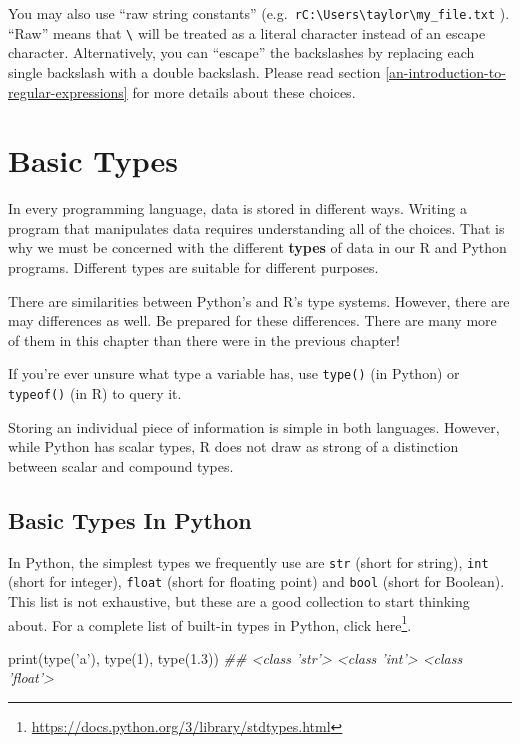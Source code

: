 \documentclass[12pt,krantz2]{krantz}
\makeatletter
\newenvironment{Shaded}{\begin{snugshade}}{\end{snugshade}}
\newcommand{\BuiltInTok}[1]{#1}
\newcommand{\CommentTok}[1]{\textcolor[rgb]{0.37,0.37,0.37}{\textit{#1}}}
\newcommand{\DecValTok}[1]{\textcolor[rgb]{0.06,0.06,0.06}{#1}}
\newcommand{\FloatTok}[1]{\textcolor[rgb]{0.06,0.06,0.06}{#1}}
\newcommand{\NormalTok}[1]{#1}
\newcommand{\StringTok}[1]{\textcolor[rgb]{0.5,0.5,0.5}{#1}}
\renewcommand{\href}[2]{#2\footnote{\url{#1}}}
\newenvironment{kframe}{%
\medskip{}
\setlength{\fboxsep}{.8em}
 \def\at@end@of@kframe{}%
 \ifinner\ifhmode%
  \def\at@end@of@kframe{\end{minipage}}%
  \begin{minipage}{\columnwidth}%
 \fi\fi%
 \def\FrameCommand##1{\hskip\@totalleftmargin \hskip-\fboxsep
 \colorbox{shadecolor}{##1}\hskip-\fboxsep
     \hskip-\linewidth \hskip-\@totalleftmargin \hskip\columnwidth}%
 \MakeFramed {\advance\hsize-\width
   \@totalleftmargin\z@ \linewidth\hsize
   \@setminipage}}%
 {\par\unskip\endMakeFramed%
 \at@end@of@kframe}
\renewenvironment{Shaded}{\begin{kframe}}{\end{kframe}}
\makeatother
\begin{document}
You may also use ``raw string constants'' (e.g.~\texttt{r\textquotesingle{}C:\textbackslash{}Users\textbackslash{}taylor\textbackslash{}my\_file.txt\textquotesingle{}} ). ``Raw'' means that \texttt{\textbackslash{}} will be treated as a literal character instead of an escape character. Alternatively, you can ``escape'' the backslashes by replacing each single backslash with a double backslash. Please read section \ref{an-introduction-to-regular-expressions} for more details about these choices.

\hypertarget{basic-types}{%
\chapter{Basic Types}\label{basic-types}}

In every programming language, data is stored in different ways. Writing a program that manipulates data requires understanding all of the choices. That is why we must be concerned with the different \textbf{types} of data in our R and Python programs. Different types are suitable for different purposes.

There are similarities between Python's and R's type systems. However, there are may differences as well. Be prepared for these differences. There are many more of them in this chapter than there were in the previous chapter!

If you're ever unsure what type a variable has, use \texttt{type()} (in Python) or \texttt{typeof()} (in R) to query it.

Storing an individual piece of information is simple in both languages. However, while Python has scalar types, R does not draw as strong of a distinction between scalar and compound types.

\hypertarget{basic-types-in-python}{%
\section{Basic Types In Python}\label{basic-types-in-python}}

In Python, the simplest types we frequently use are \texttt{str} (short for string), \texttt{int} (short for integer), \texttt{float} (short for floating point) and \texttt{bool} (short for Boolean). This list is not exhaustive, but these are a good collection to start thinking about. For a complete list of built-in types in Python, click \href{https://docs.python.org/3/library/stdtypes.html}{here}.

\begin{Shaded}
\begin{Highlighting}[]
\BuiltInTok{print}\NormalTok{(}\BuiltInTok{type}\NormalTok{(}\StringTok{'a'}\NormalTok{), }\BuiltInTok{type}\NormalTok{(}\DecValTok{1}\NormalTok{), }\BuiltInTok{type}\NormalTok{(}\FloatTok{1.3}\NormalTok{))}
\CommentTok{## <class 'str'> <class 'int'> <class 'float'>}
\end{Highlighting}
\end{Shaded}
\end{document}
